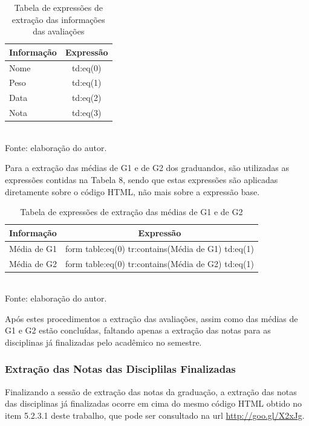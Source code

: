 \begin{table}[!hbt]
\centering
\caption[Extração de Informações - Expressões de Extração]{Tabela de expressões de extração das informações das avaliações}
\vspace{3mm}
\begin{tabular}{p{3cm}|c}\hline
\bf{Informação} & \bf{Expressão} \\ \hline
Nome & td:eq(0)\\ \hline
Peso & td:eq(1)\\ \hline
Data & td:eq(2)\\ \hline
Nota & td:eq(3)\\ \hline
\end{tabular}
\\ Fonte: elaboração do autor.
\end{table}

Para a extração das médias de G1 e de G2 dos graduandos, são utilizadas as expressões contidas na Tabela 8, sendo que estas expressões são aplicadas diretamente sobre o código HTML, não mais sobre a expressão base.

\begin{table}[!hbt]
\centering
\caption[Extração de Informações - Extração das Médias]{Tabela de expressões de extração das médias de G1 e de G2}
\vspace{3mm}
\begin{tabular}{p{3cm}|c}\hline
\bf{Informação} & \bf{Expressão} \\ \hline
Média de G1 & form table:eq(0) tr:contains(Média de G1) td:eq(1)\\ \hline
Média de G2 & form table:eq(0) tr:contains(Média de G2) td:eq(1)\\ \hline
\end{tabular}
\\ Fonte: elaboração do autor.
\end{table}

Após estes procedimentos a extração das avaliações, assim como das médias de G1 e G2 estão concluídas, faltando apenas a extração das notas para as disciplinas já finalizadas pelo acadêmico no semestre.

\subsubsection{Extração das Notas das Disciplilas Finalizadas}
Finalizando a sessão de extração das notas da graduação, a extração das notas das disciplinas já finalizadas ocorre em cima do mesmo código HTML obtido no item 5.2.3.1 deste trabalho, que pode ser consultado na url \url{http://goo.gl/X2xJg}.


